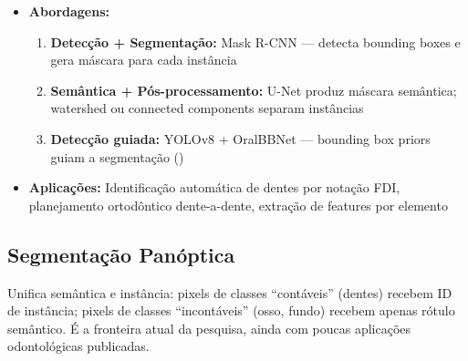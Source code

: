 \begin{itemize}
  \item \textbf{Abordagens:}
        \begin{enumerate}
          \item \textbf{Detecção + Segmentação:} Mask R-CNN --- detecta bounding
                boxes e gera máscara para cada instância
          \item \textbf{Semântica + Pós-processamento:} U-Net produz máscara
                semântica; watershed ou connected components separam instâncias
          \item \textbf{Detecção guiada:} YOLOv8 + OralBBNet --- bounding box
                priors guiam a segmentação ()
        \end{enumerate}
  \item \textbf{Aplicações:} Identificação automática de dentes por notação FDI,
        planejamento ortodôntico dente-a-dente, extração de features por elemento
\end{itemize}

\subsection{Segmentação Panóptica}

Unifica semântica e instância: pixels de classes ``contáveis'' (dentes) recebem
ID de instância; pixels de classes ``incontáveis'' (osso, fundo) recebem apenas
rótulo semântico. É a fronteira atual da pesquisa, ainda com poucas aplicações
odontológicas publicadas.


